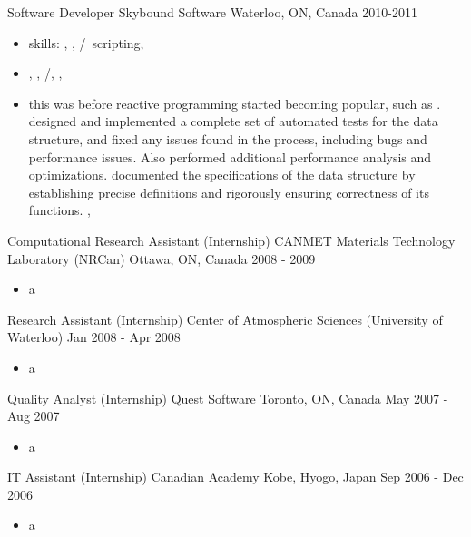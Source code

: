 \cventry
  {Software Developer} %
  {Skybound Software} %
  {Waterloo, ON, Canada} %
  {2010-2011} %
  {
    \begin{itemize} %
      \item {skills: \rfcsharp, \rftypescript, \rfhtml/\rfcss \rfbash \ scripting, \rfaws}
      \item{
      \tgskills \rfcsharp, \rftypescript, \rfhtml/\rfcss, \rfbash, \rfaws
      }
      \item{
      this was before reactive programming started becoming popular, such as \rfreact.
      \tgsubitem designed and implemented a complete set of automated tests for the data structure, 
      and fixed any issues found in the process, including bugs and performance issues. 
      Also performed additional performance analysis and optimizations.
      \tgsubitem documented the specifications of the data structure by establishing precise definitions and rigorously ensuring correctness of its functions.
      \tgskills \rfcsharp, \rflatex
      }
    \end{itemize}
  }

\cventry
  {Computational Research Assistant (Internship)} %
  {CANMET Materials Technology Laboratory (NRCan)} %
  {Ottawa, ON, Canada} %
  {2008 - 2009} %
  {
    \begin{itemize} %
      \item {a}
    \end{itemize}
  }

\cventry
  {Research Assistant (Internship)} %
  {Center of Atmospheric Sciences (University of Waterloo)} %
  {Jan 2008 - Apr 2008} %
  {} %
  {
    \begin{itemize} %
      \item {a}
    \end{itemize}
  }

\cventry
  {Quality Analyst (Internship)} %
  {Quest Software} %
  {Toronto, ON, Canada} %
  {May 2007 - Aug 2007} %
  {
    \begin{itemize} %
      \item {a}
    \end{itemize}
  }
\cventry
  {IT Assistant (Internship)} %
  {Canadian Academy} %
  {Kobe, Hyogo, Japan} %
  {Sep 2006 - Dec 2006} %
  {
    \begin{itemize} %
      \item {a}
    \end{itemize}
  }

